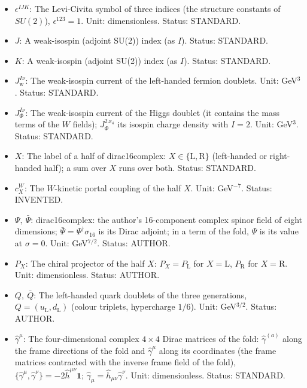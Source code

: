 \documentclass[
  10pt,
]{article}
\begin{document}
\begin{itemize}
  dimensionless. Value: \(g_2(m_Z) = 0.6517\). Status: STANDARD.
\item
  \(\epsilon^{IJK}\): The Levi-Civita symbol of three indices (the
  structure constants of \(SU(2)\)), \(\epsilon^{123} = 1\). Unit:
  dimensionless. Status: STANDARD.
\item
  \(J\): A weak-isospin (adjoint SU(2)) index (as \(I\)). Status:
  STANDARD.
\item
  \(K\): A weak-isospin (adjoint SU(2)) index (as \(I\)). Status:
  STANDARD.
\item
  \(J_{\mathrm{w}}^{I\nu}\): The weak-isospin current of the left-handed
  fermion doublets. Unit: GeV\(^3\). Status: STANDARD.
\item
  \(J_\Phi^{I\nu}\): The weak-isospin current of the Higgs doublet (it
  contains the mass terms of the \(W\) fields); \(J_\Phi^{2\,x_4}\) its
  isospin charge density with \(I = 2\). Unit: GeV\(^3\). Status:
  STANDARD.
\item
  \(X\): The label of a half of dirac16complex:
  \(X \in \{\mathrm{L}, \mathrm{R}\}\) (left-handed or right-handed
  half); a sum over \(X\) runs over both. Status: STANDARD.
\item
  \(c^{W}_X\): The \(W\)-kinetic portal coupling of the half \(X\).
  Unit: GeV\(^{-7}\). Status: INVENTED.
\item
  \(\Psi,\ \bar\Psi\): dirac16complex: the author's 16-component complex
  spinor field of eight dimensions;
  \(\bar\Psi = \Psi^\dagger\sigma_{16}\) is its Dirac adjoint; in a term
  of the fold, \(\Psi\) is its value at \(\sigma = 0\). Unit:
  GeV\(^{7/2}\). Status: AUTHOR.
\item
  \(P_X\): The chiral projector of the half \(X\):
  \(P_X = P_{\mathrm{L}}\) for \(X = \mathrm{L}\), \(P_{\mathrm{R}}\)
  for \(X = \mathrm{R}\). Unit: dimensionless. Status: AUTHOR.
\item
  \(Q,\ \bar Q\): The left-handed quark doublets of the three
  generations, \(Q = (u_{\mathrm{L}}, d_{\mathrm{L}})\) (colour
  triplets, hypercharge \(1/6\)). Unit: GeV\(^{3/2}\). Status: AUTHOR.
\item
  \(\hat\gamma^\mu\): The four-dimensional complex \(4 \times 4\) Dirac
  matrices of the fold: \(\hat\gamma^{(a)}\) along the frame directions
  of the fold and \(\hat\gamma^\mu\) along its coordinates (the frame
  matrices contracted with the inverse frame field of the fold),
  \(\{\hat\gamma^\mu, \hat\gamma^\nu\} = -2\hat h^{\mu\nu}\mathbf{1}\);
  \(\hat\gamma_\mu = \hat h_{\mu\nu}\hat\gamma^\nu\). Unit:
  dimensionless. Status: STANDARD.

\end{itemize}
\end{document}
